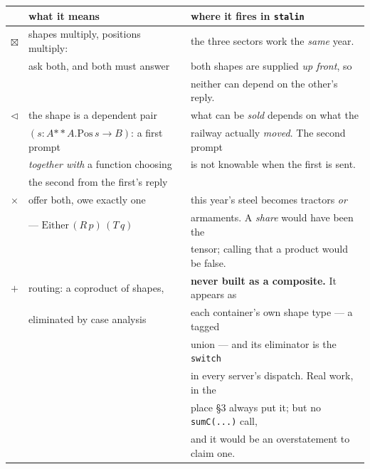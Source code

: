 \documentclass[11pt,a4paper]{article}
\begin{document}
\begin{center}
\footnotesize
\begin{tabular}{@{}c l l@{}}
\toprule
& \textbf{what it means} & \textbf{where it fires in \texttt{stalin}} \\
\midrule
\textcolor{tensor}{$\boxtimes$} & shapes multiply, positions multiply:
  & the three sectors work the \emph{same} year. \\
 & ask both, and both must answer
  & both shapes are supplied \emph{up front}, so\\
 & & neither can depend on the other's reply. \\[1.5mm]
\textcolor{seq}{$\lhd$} & the shape is a dependent pair
  & what can be \emph{sold} depends on what the \\
 & $(s : A \mathbin{**} A.\mathrm{Pos}\,s \to B)$: a first prompt
  & railway actually \emph{moved}. The second prompt \\
 & \emph{together with} a function choosing
  & is not knowable when the first is sent. \\
 & the second from the first's reply & \\[1.5mm]
\textcolor{prod}{$\times$} & offer both, owe exactly one
  & this year's steel becomes tractors \emph{or} \\
 & --- $\mathrm{Either}\,(R\,p)\,(T\,q)$
  & armaments. A \emph{share} would have been the \\
 & & tensor; calling that a product would be false. \\[1.5mm]
\textcolor{sum}{$+$} & routing: a coproduct of shapes,
  & \textbf{never built as a composite.} It appears as
  \\
 & eliminated by case analysis
  & each container's own shape type --- a tagged \\
 & & union --- and its eliminator is the
  \texttt{switch} \\
 & & in every server's dispatch. Real work, in the \\
 & & place \S3 always put it; but no \texttt{sumC(...)} call, \\
 & & and it would be an overstatement to claim one. \\
\bottomrule
\end{tabular}
\end{center}
\end{document}
